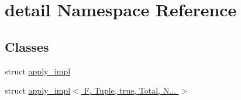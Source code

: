 \hypertarget{namespacedetail}{}\section{detail Namespace Reference}
\label{namespacedetail}
\subsection*{Classes}
\begin{DoxyCompactItemize}
\item 
struct \hyperlink{structdetail_1_1apply__impl}{apply\+\_\+impl}
\item 
struct \hyperlink{structdetail_1_1apply__impl_3_01_f_00_01_tuple_00_01true_00_01_total_00_01_n_8_8_8_01_4}{apply\+\_\+impl$<$ F, Tuple, true, Total, N... $>$}
\end{DoxyCompactItemize}
